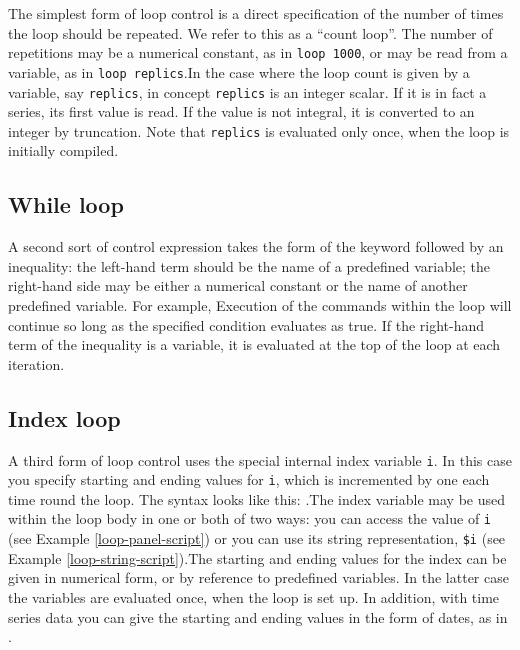 The simplest form of loop control is a direct specification of the
number of times the loop should be repeated.  We refer to this as a
``count loop''.  The number of repetitions may be a numerical
constant, as in \verb+loop 1000+, or may be read from a variable, as
in \verb+loop replics+.In the case where the loop count is given by a
variable, say \verb+replics+, in concept \verb+replics+ is an integer
scalar.  If it is in fact a series, its first value is read.  If the
value is not integral, it is converted to an integer by truncation.
Note that \verb+replics+ is evaluated only once, when the loop is
initially compiled.
      

\subsection{While loop}
\label{loop-while}

A second sort of control expression takes the form of the keyword
 followed by an inequality: the left-hand term should be
the name of a predefined variable; the right-hand side may be either a
numerical constant or the name of another predefined variable.  For
example,  Execution of the commands
within the loop will continue so long as the specified condition
evaluates as true. If the right-hand term of the inequality is a
variable, it is evaluated at the top of the loop at each iteration.

\subsection{Index loop}
\label{loop-index}

A third form of loop control uses the special internal index variable
\verb+i+.  In this case you specify starting and ending values for
\verb+i+, which is incremented by one each time round the loop.  The
syntax looks like this: .The index variable may be
used within the loop body in one or both of two ways: you can access
the value of \verb+i+ (see Example \ref{loop-panel-script}) or you can
use its string representation, \verb+$i+ (see Example
\ref{loop-string-script}).The starting and ending values for the index
can be given in numerical form, or by reference to predefined
variables.  In the latter case the variables are evaluated once, when
the loop is set up.  In addition, with time series data you can give
the starting and ending values in the form of dates, as in .
      

